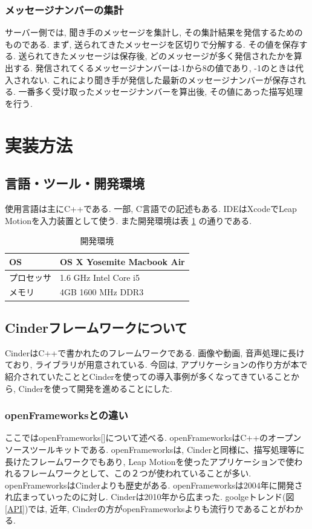 \documentclass{funthesis}
\begin{document}
\subsubsection{メッセージナンバーの集計}
サーバー側では, 聞き手のメッセージを集計し,  その集計結果を発信するためのものである.
まず, 送られてきたメッセージを区切りで分解する. その値を保存する.
送られてきたメッセージは保存後, どのメッセージが多く発信されたかを算出する. 発信されてくるメッセージナンバーは-1から8の値であり, -1のときは代入されない. これにより聞き手が発信した最新のメッセージナンバーが保存される. 一番多く受け取ったメッセージナンバーを算出後, その値にあった描写処理を行う.  

\section{実装方法}

\subsection{言語・ツール・開発環境}
使用言語は主にC++である. 一部, C言語での記述もある. IDEはXcodeでLeap Motionを入力装置として使う. また開発環境は表 \ref{env} の通りである. 

\begin{table}[H]
\begin{center}
\caption{開発環境}
  \begin{tabular}{ll}
  
   \hline
OS & OS X  Yosemite Macbook Air \\ 
  \hline
プロセッサ & 1.6 GHz Intel Core i5\\ 
  \hline
メモリ & 4GB 1600 MHz DDR3\\ 
  \hline
  \end{tabular}
  \label{env}
  \end{center}
\end{table}


\subsection{Cinderフレームワークについて}
CinderはC++で書かれたのフレームワークである. 画像や動画, 音声処理に長けており, ライブラリが用意されている. 今回は, アプリケーションの作り方が本で紹介されていたこととCinderを使っての導入事例が多くなってきていることから, Cinderを使って開発を進めることにした. 



\subsubsection{openFrameworksとの違い}
ここではopenFrameworks[]について述べる. openFrameworksはC++のオープンソースツールキットである. openFrameworksは, Cinderと同様に、描写処理等に長けたフレームワークでもあり, Leap Motionを使ったアプリケーションで使われるフレームワークとして、この２つが使われていることが多い. 
openFrameworksはCinderよりも歴史がある. openFrameworksは2004年に開発され広まっていったのに対し. Cinderは2010年から広まった. goolgeトレンド(図\ref{API})では, 近年, Cinderの方がopenFrameworksよりも流行りであることがわかる. 
\end{document}
